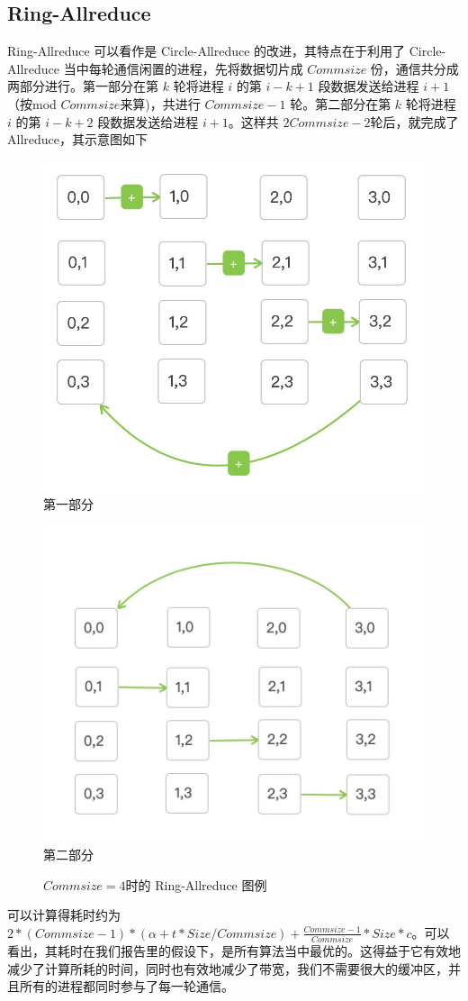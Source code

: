 \documentclass{article}
\begin{document}
\subsection{Ring-Allreduce}
Ring-Allreduce 可以看作是 Circle-Allreduce 的改进，其特点在于利用了 Circle-Allreduce 当中每轮通信闲置的进程，先将数据切片成 $Commsize$ 份，通信共分成两部分进行。第一部分在第 $k$ 轮将进程 $i$ 的第 $i-k+1$ 段数据发送给进程 $i+1$ （按mod $Commsize$来算)，共进行 $Commsize-1$ 轮。第二部分在第 $k$ 轮将进程 $i$ 的第 $i-k+2$ 段数据发送给进程 $i+1$。这样共 $2Commsize-2$轮后，就完成了 Allreduce，其示意图如下
	\begin{figure}[H]
\centering
	\begin{minipage}{0.48\linewidth}
		\centering
	\includegraphics[width=0.8\linewidth]{./fig/ring1}
	\\第一部分
	\end{minipage}
			\begin{minipage}{0.48\linewidth}
				\centering
			\includegraphics[width=0.8\linewidth]{./fig/ring2}
			\\第二部分
			\end{minipage}
	\caption{$Commsize = 4$时的 Ring-Allreduce 图例\label{fig:ring}}
\end{figure}
可以计算得耗时约为$2*(Commsize-1)*(\alpha+t*Size/Commsize)+\frac{Commsize-1}{Commsize}*Size*c$。可以看出，其耗时在我们报告里的假设下，是所有算法当中最优的。这得益于它有效地减少了计算所耗的时间，同时也有效地减少了带宽，我们不需要很大的缓冲区，并且所有的进程都同时参与了每一轮通信。
\end{document}
